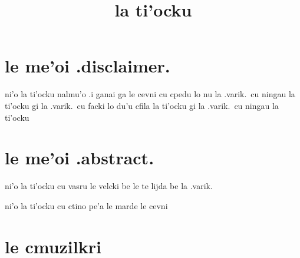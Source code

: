 \documentclass{report}
\title{la ti'ocku}
\begin{document}
\maketitle

\chapter{le me'oi .disclaimer.}
ni'o la ti'ocku nalmu'o  .i ganai ga le cevni cu cpedu lo nu la .varik.\ cu ningau la ti'ocku gi la .varik.\ cu facki lo du'u cfila la ti'ocku gi la .varik.\ cu ningau la ti'ocku

\chapter{le me'oi .abstract.}
ni'o la ti'ocku cu vasru le velcki be le te lijda be la .varik.

ni'o la ti'ocku cu ctino pe'a le marde le cevni

\chapter{le cmuzilkri}
\end{document}
